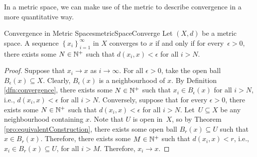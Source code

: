 \documentclass[math]{amznotes}
\theoremstyle{remark}
\begin{document}
In a metric space, we can make use of the metric to describe convergence in a more quantitative way.
\begin{thmbox}{Convergence in Metric Spaces}{metricSpaceConverge}
    Let $\left(X, d\right)$ be a metric space. A sequence $\left\{x_i\right\}_{i = 1}^{\infty}$ in $X$ converges to $x$ if and only if for every~$\epsilon > 0$, there exists some $N \in \mathbb{N}^+$ such that $d\left(x_i, x\right) < \epsilon$ for all $i > N$.
    \tcblower
    \begin{proof}
        Suppose that $x_i \to x$ as $i \to \infty$. For all $\epsilon > 0$, take the open ball $B_{\epsilon}\left(x\right) \subseteq X$. Clearly, $B_{\epsilon}\left(x\right)$ is a neighbourhood of $x$. By Definition \ref{dfn:convergence}, there exists some $N \in \mathbb{N}^+$ such that $x_i \in B_{\epsilon}\left(x\right)$ for all $i > N$, i.e., $d\left(x_i, x\right) < \epsilon$ for all $i > N$. Conversely, suppose that for every $\epsilon > 0$, there exists some $N \in \mathbb{N}^+$ such that $d\left(x_i, x\right) < \epsilon$ for all $i > N$. Let~$U \subseteq X$ be any neighbourhood containing $x$. Note that $U$ is open in~$X$, so by Theorem \ref{pro:equivalentConstruction}, there exists some open ball $B_r\left(x\right) \subseteq U$ such that $x \in B_r\left(x\right)$. Therefore, there exists some $M \in \mathbb{N}^+$ such that $d\left(x_i, x\right) < r$, i.e., $x_i \in B_r\left(x\right) \subseteq U$, for all $i > M$. Therefore, $x_i \to x$.
    \end{proof}
\end{thmbox}
\end{document}
